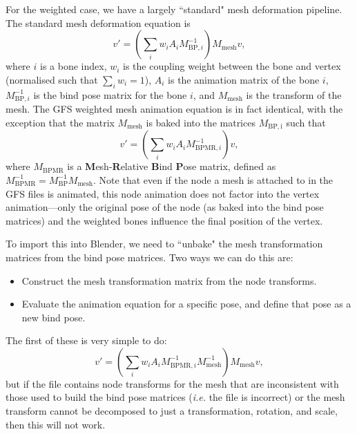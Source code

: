 \documentclass{article}
\begin{document}
For the weighted case, we have a largely ``standard" mesh deformation pipeline. The standard mesh deformation equation is
\begin{equation}
v' = \left( \sum_i w_i A_i M_{\mathrm{BP}, i}^{-1} \right) M_\mathrm{mesh} v,
\end{equation}
where $i$ is a bone index, $w_i$ is the coupling weight between the bone and vertex (normalised such that $\sum_i w_i = 1$), $A_i$ is the animation matrix of the bone $i$, $M_{\mathrm{BP}, i}^{-1}$ is the bind pose matrix for the bone $i$, and $M_\mathrm{mesh}$ is the transform of the mesh. The GFS weighted mesh animation equation is in fact identical, with the exception that the matrix $M_\mathrm{mesh}$ is baked into the matrices $M_\mathrm{BP, i}$ such that
\begin{equation}
v' = \left( \sum_i w_i A_i M_{\mathrm{BPMR}, i}^{-1} \right) v,
\end{equation}
where $M_{\mathrm{BPMR}}$ is a \textbf{M}esh-\textbf{R}elative \textbf{B}ind \textbf{P}ose matrix, defined as $M_{\mathrm{BPMR}}^{-1} = M_\mathrm{BP}^{-1} M_\mathrm{mesh}$. Note that even if the node a mesh is attached to in the GFS files is animated, this node animation does not factor into the vertex animation---only the original pose of the node (as baked into the bind pose matrices) and the weighted bones influence the final position of the vertex.

To import this into Blender, we need to ``unbake" the mesh transformation matrices from the bind pose matrices. Two ways we can do this are:
\begin{itemize}
\item Construct the mesh transformation matrix from the node transforms.
\item Evaluate the animation equation for a specific pose, and define that pose as a new bind pose.
\end{itemize}

The first of these is very simple to do:
\begin{equation}
v' = \left( \sum_i w_i A_i M_{\mathrm{BPMR}, i}^{-1} M_{\mathrm{mesh}}^{-1} \right)  M_{\mathrm{mesh}} v,
\end{equation}
but if the file contains node transforms for the mesh that are inconsistent with those used to build the bind pose matrices (\textit{i.e.} the file is incorrect) or the mesh transform cannot be decomposed to just a transformation, rotation, and scale, then this will not work.
\end{document}

